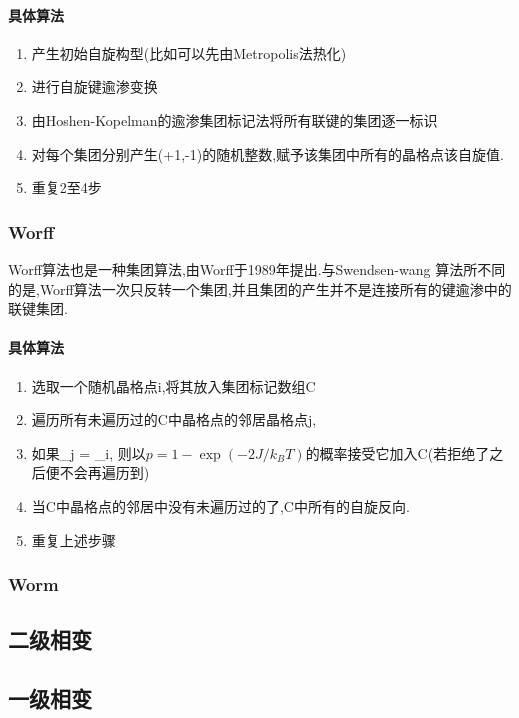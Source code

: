 \documentclass[12pt]{article} %
\begin{document}
\paragraph{具体算法}
\begin{enumerate}
    \item 产生初始自旋构型(比如可以先由Metropolis法热化)
    \item 进行自旋键逾渗变换
    \item 由Hoshen-Kopelman的逾渗集团标记法将所有联键的集团逐一标识
    \item 对每个集团分别产生(+1,-1)的随机整数,赋予该集团中所有的晶格点该自旋值.
    \item 重复2至4步
\end{enumerate}

\subsubsection{Worff}
Worff算法也是一种集团算法,由Worff于1989年提出\cite{Wolff:1988uh}.与Swendsen-wang
算法所不同的是,Worff算法一次只反转一个集团,并且集团的产生并不是连接所有的键逾渗中的联键集团.\cite{Krauth:2003ts}

\paragraph{具体算法}
\begin{enumerate}
    \item 选取一个随机晶格点i,将其放入集团标记数组C
    \item 遍历所有未遍历过的C中晶格点的邻居晶格点j,
    \item 如果\sigma_{j} = \sigma_{i}, 则以$p=1-\exp(-2J/k_{B}T)$的概率接受它加入C(若拒绝了之后便不会再遍历到)
    \item 当C中晶格点的邻居中没有未遍历过的了,C中所有的自旋反向.
    \item 重复上述步骤
\end{enumerate}

\subsubsection{Worm}


\subsection{二级相变}

\subsection{一级相变}
\end{document}
